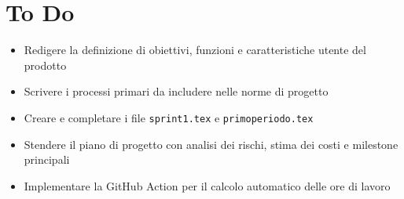 \documentclass[a4paper, 12pt]{article}
\begin{document}
\section{To Do}
\begin{itemize}
    \item Redigere la definizione di obiettivi, funzioni e caratteristiche utente del prodotto
    \item Scrivere i processi primari da includere nelle norme di progetto
    \item Creare e completare i file \texttt{sprint1.tex} e \texttt{primoperiodo.tex}
    \item Stendere il piano di progetto con analisi dei rischi, stima dei costi e milestone principali
    \item Implementare la GitHub Action per il calcolo automatico delle ore di lavoro
\end{itemize}
\end{document}

